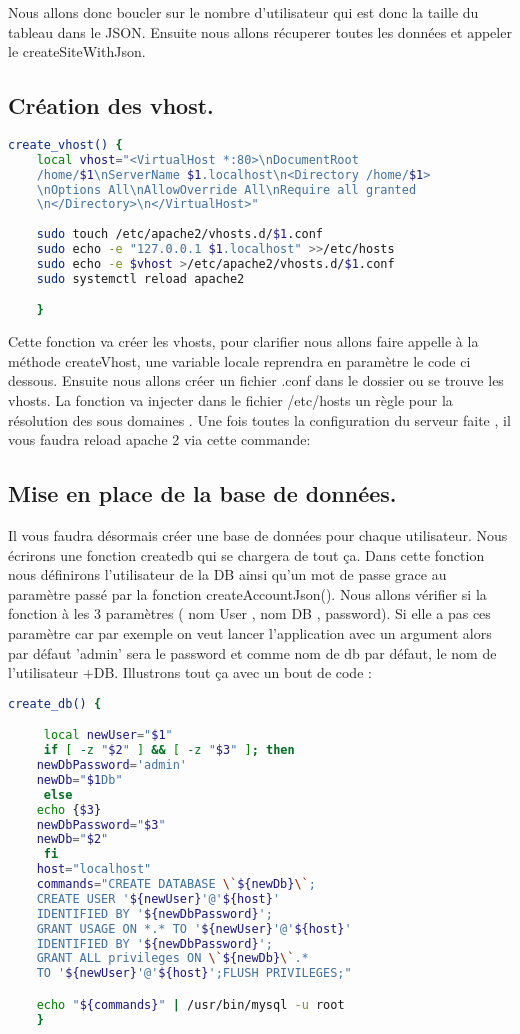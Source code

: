 \documentclass{article}
\begin{document}
	Nous allons donc boucler sur le nombre d'utilisateur qui est donc la taille du tableau dans le JSON. Ensuite nous allons récuperer toutes les données et appeler
	le createSiteWithJson. 

\subsection{Création des vhost.}

	\begin{lstlisting}[language=bash]
	create_vhost() {
	local vhost="<VirtualHost *:80>\nDocumentRoot
	/home/$1\nServerName $1.localhost\n<Directory /home/$1>
	\nOptions All\nAllowOverride All\nRequire all granted
	\n</Directory>\n</VirtualHost>"
	
	sudo touch /etc/apache2/vhosts.d/$1.conf
	sudo echo -e "127.0.0.1 $1.localhost" >>/etc/hosts
	sudo echo -e $vhost >/etc/apache2/vhosts.d/$1.conf
	sudo systemctl reload apache2

	}
	\end{lstlisting}
	
	Cette fonction va créer les vhosts, pour clarifier nous allons faire appelle à la méthode createVhost, une variable locale reprendra en paramètre le code ci dessous. 
	Ensuite nous allons créer un fichier .conf dans le dossier ou se trouve les vhosts. La fonction va injecter dans le fichier /etc/hosts un règle pour la résolution des sous domaines .
	Une fois toutes la configuration du serveur faite , il vous faudra reload apache 2 via cette commande: 

\subsection{Mise en place de la base de données.}

	Il vous faudra désormais créer une base de données pour chaque utilisateur. Nous écrirons une fonction createdb qui se chargera de tout ça.
	Dans cette fonction nous définirons l'utilisateur de la DB ainsi qu'un mot de passe grace au paramètre passé par la fonction createAccountJson(). Nous allons vérifier si la fonction à les 3 paramètres ( nom User , nom DB , password).
	Si elle a pas ces paramètre car par exemple on veut lancer l'application avec un argument alors par défaut 'admin' sera le password et comme nom de db par défaut,
	le nom de l'utilisateur +DB. Illustrons tout ça avec un bout de code :

\begin{lstlisting}[language=bash]
   create_db() {

     local newUser="$1"
     if [ -z "$2" ] && [ -z "$3" ]; then
	newDbPassword='admin'
	newDb="$1Db"
     else
	echo {$3}
	newDbPassword="$3"
	newDb="$2"
     fi
	host="localhost"
	commands="CREATE DATABASE \`${newDb}\`;
	CREATE USER '${newUser}'@'${host}'
	IDENTIFIED BY '${newDbPassword}';
	GRANT USAGE ON *.* TO '${newUser}'@'${host}'
	IDENTIFIED BY '${newDbPassword}';
	GRANT ALL privileges ON \`${newDb}\`.*
	TO '${newUser}'@'${host}';FLUSH PRIVILEGES;"

	echo "${commands}" | /usr/bin/mysql -u root
    }
\end{lstlisting}
\end{document}
